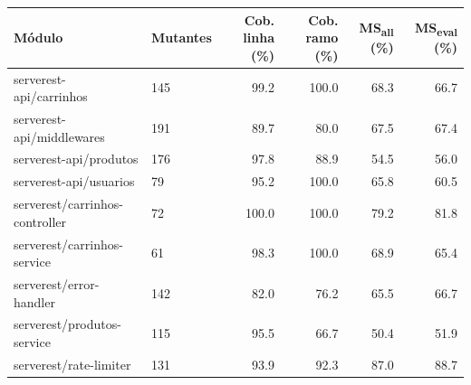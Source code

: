 \begin{tabular}{llrrrr}
\toprule
Módulo & Mutantes & Cob. linha (\%) & Cob. ramo (\%) & MS\textsubscript{all} (\%) & MS\textsubscript{eval} (\%) \\
\midrule
serverest-api/carrinhos & 145 & 99.2 & 100.0 & 68.3 & 66.7 \\
serverest-api/middlewares & 191 & 89.7 & 80.0 & 67.5 & 67.4 \\
serverest-api/produtos & 176 & 97.8 & 88.9 & 54.5 & 56.0 \\
serverest-api/usuarios & 79 & 95.2 & 100.0 & 65.8 & 60.5 \\
serverest/carrinhos-controller & 72 & 100.0 & 100.0 & 79.2 & 81.8 \\
serverest/carrinhos-service & 61 & 98.3 & 100.0 & 68.9 & 65.4 \\
serverest/error-handler & 142 & 82.0 & 76.2 & 65.5 & 66.7 \\
serverest/produtos-service & 115 & 95.5 & 66.7 & 50.4 & 51.9 \\
serverest/rate-limiter & 131 & 93.9 & 92.3 & 87.0 & 88.7 \\
\bottomrule
\end{tabular}
